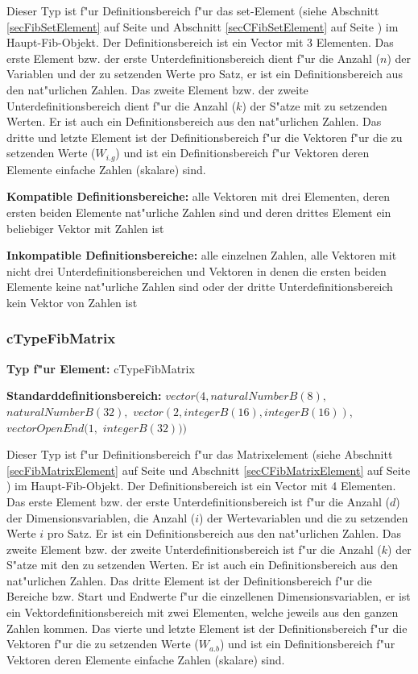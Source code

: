 Dieser Typ ist f"ur Definitionsbereich f"ur das set-Element (siehe Abschnitt \ref{secFibSetElement} auf Seite \pageref{secFibSetElement} und Abschnitt \ref{secCFibSetElement} auf Seite \pageref{secCFibSetElement}) im Haupt-Fib-Objekt. Der Definitionsbereich ist ein Vector mit 3 Elementen.  Das erste Element bzw. der erste Unterdefinitionsbereich dient f"ur die Anzahl ($n$) der Variablen und der zu setzenden Werte pro Satz, er ist ein Definitionsbereich aus den nat"urlichen Zahlen. Das zweite Element bzw. der zweite Unterdefinitionsbereich dient f"ur die Anzahl ($k$) der S"atze mit zu setzenden Werten. Er ist auch ein Definitionsbereich aus den nat"urlichen Zahlen. Das dritte und letzte Element ist der Definitionsbereich f"ur die Vektoren f"ur die zu setzenden Werte ($W_{i.g}$) und ist ein Definitionsbereich f"ur Vektoren deren Elemente einfache Zahlen (skalare) sind.

\bigskip\noindent
\textbf{Kompatible Definitionsbereiche:} alle Vektoren mit drei Elementen, deren ersten beiden Elemente nat"urliche Zahlen sind und deren drittes Element ein beliebiger Vektor mit Zahlen ist

\bigskip\noindent
\textbf{Inkompatible Definitionsbereiche:} alle einzelnen Zahlen, alle Vektoren mit nicht drei Unterdefinitionsbereichen und Vektoren in denen die ersten beiden Elemente keine nat"urliche Zahlen sind oder der dritte Unterdefinitionsbereich kein Vektor von Zahlen ist


\subsubsection{cTypeFibMatrix}

\textbf{Typ f"ur Element:} cTypeFibMatrix

\bigskip\noindent
\textbf{Standarddefinitionsbereich:} $vector( 4, naturalNumberB(8),$ $naturalNumberB(32),$ $vector( 2 , integerB(16), integerB(16) )$, $vectorOpenEnd( 1,$ $integerB(32) ) )$

Dieser Typ ist f"ur Definitionsbereich f"ur das Matrixelement (siehe Abschnitt \ref{secFibMatrixElement} auf Seite \pageref{secFibMatrixElement} und Abschnitt \ref{secCFibMatrixElement} auf Seite \pageref{secCFibMatrixElement}) im Haupt-Fib-Objekt. Der Definitionsbereich ist ein Vector mit 4 Elementen.  Das erste Element bzw. der erste Unterdefinitionsbereich ist f"ur die Anzahl ($d$) der Dimensionsvariablen, die Anzahl ($i$) der Wertevariablen und die zu setzenden Werte $i$ pro Satz. Er ist ein Definitionsbereich aus den nat"urlichen Zahlen. Das zweite Element bzw. der zweite Unterdefinitionsbereich ist f"ur die Anzahl ($k$) der S"atze mit den zu setzenden Werten. Er ist auch ein Definitionsbereich aus den nat"urlichen Zahlen. Das dritte Element ist der Definitionsbereich f"ur die Bereiche bzw. Start und Endwerte f"ur die einzellenen Dimensionsvariablen, er ist ein Vektordefinitionsbereich mit zwei Elementen, welche jeweils aus den ganzen Zahlen kommen. Das vierte und letzte Element ist der Definitionsbereich f"ur die Vektoren f"ur die zu setzenden Werte ($W_{a.b}$) und ist ein Definitionsbereich f"ur Vektoren deren Elemente einfache Zahlen (skalare) sind.


